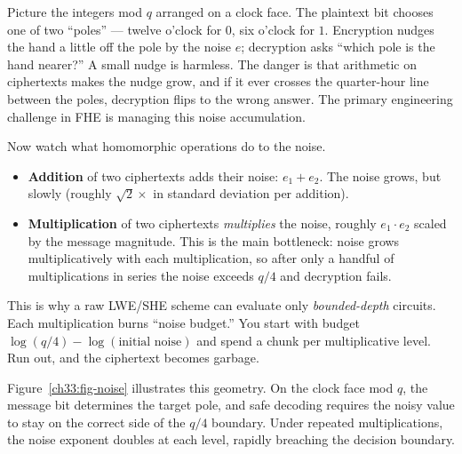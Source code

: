 \begin{intuitionbox}
Picture the integers mod $q$ arranged on a clock face. The plaintext bit chooses one of two ``poles'' --- twelve o'clock for $0$, six o'clock for $1$. Encryption nudges the hand a little off the pole by the noise $e$; decryption asks ``which pole is the hand nearer?'' A small nudge is harmless. The danger is that arithmetic on ciphertexts makes the nudge grow, and if it ever crosses the quarter-hour line between the poles, decryption flips to the wrong answer. The primary engineering challenge in FHE is managing this noise accumulation.
\end{intuitionbox}

Now watch what homomorphic operations do to the noise.
\begin{itemize}
  \item \textbf{Addition} of two ciphertexts adds their noise: $e_1 + e_2$. The noise grows, but slowly (roughly $\sqrt{2}\times$ in standard deviation per addition).
  \item \textbf{Multiplication} of two ciphertexts \emph{multiplies} the noise, roughly $e_1\cdot e_2$ scaled by the message magnitude. This is the main bottleneck: noise grows multiplicatively with each multiplication, so after only a handful of multiplications in series the noise exceeds $q/4$ and decryption fails.
\end{itemize}

This is why a raw LWE/SHE scheme can evaluate only \emph{bounded-depth} circuits. Each multiplication burns ``noise budget.'' You start with budget $\log(q/4) - \log(\text{initial noise})$ and spend a chunk per multiplicative level. Run out, and the ciphertext becomes garbage.

Figure~\ref{ch33:fig-noise} illustrates this geometry. On the clock face mod $q$, the message bit determines the target pole, and safe decoding requires the noisy value to stay on the correct side of the $q/4$ boundary. Under repeated multiplications, the noise exponent doubles at each level, rapidly breaching the decision boundary.

